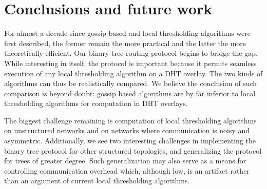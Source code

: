 \documentclass[12pt,english,journal]{elsarticle}
\numberwithin{equation}{section}
\numberwithin{figure}{section}
\theoremstyle{plain}
\theoremstyle{plain}
\begin{document}
\section{\label{sec:Conclusions}Conclusions and future work}

For almost a decade since gossip based and local thresholding algorithms
were first described, the former remain the more practical and the
latter the more theoretically efficient. Our binary tree routing protocol
begins to bridge the gap. While interesting in itself, the protocol
is important because it permits seamless execution of any local thresholding
algorithm on a DHT overlay. The two kinds of algorithms can thus be
realistically compared. We believe the conclusion of such comparison
is beyond doubt: gossip based algorithms are by far inferior to local
thresholding algorithms for computation in DHT overlays.

The biggest challenge remaining is computation of local thresholding
algorithms on unstructured networks and on networks where communication
is noisy and asymmetric. Additionally, we see two interesting challenges
in implementing the binary tree protocol for other structured topologies,
and generalizing the protocol for trees of greater degree. Such generalization
may also serve as a means for controlling communication overhead which,
although low, is an artifact rather than an argument of current local
thresholding algorithms.





\appendix
\end{document}
